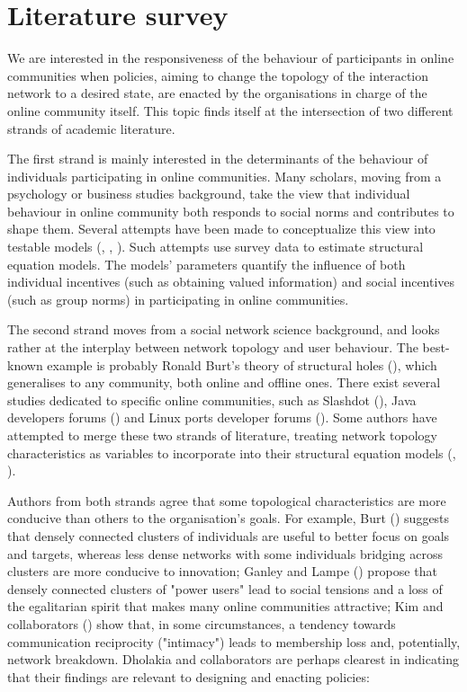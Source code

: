 \section{Literature survey}

We are interested in the responsiveness of the behaviour of participants in online communities when policies, aiming to change the topology of the interaction network to a desired state, are enacted by the organisations in charge of the online community itself. This topic finds itself at the intersection of two different strands of academic literature.

The first strand is mainly interested in the determinants of the behaviour of individuals participating in online communities. Many scholars, moving from a psychology or business studies background, take the view that individual behaviour in online community both responds to social norms and contributes to shape them. Several attempts have been made to conceptualize this view into testable models (\cite{armstrong2000online}, \cite{dholakia2004social}, \cite{zhou2011social}). Such attempts use survey data to estimate structural equation models. The models' parameters quantify the influence of both individual incentives (such as obtaining valued information) and social incentives (such as group norms) in participating in online communities. 

The second strand moves from a social network science background, and looks rather at the interplay between network topology and user behaviour. The best-known example is probably Ronald Burt's theory of structural holes (\cite{burt2005brokerage}), which generalises to any community, both online and offline ones. There exist several studies dedicated to specific online communities, such as Slashdot (\cite{toral2009empirical}), Java developers forums (\cite{zhang2007expertise}) and Linux ports developer forums (\cite{ganley2009ties}). Some authors have attempted to merge these two strands of literature, treating network topology characteristics as variables to incorporate into their structural equation models (\cite{toral2009empirical}, \cite{ganley2009ties}).

Authors from both strands agree that some topological characteristics are more conducive than others to the organisation's goals. For example, Burt (\cite{burt2005brokerage}) suggests that densely connected clusters of individuals are useful to better focus on goals and targets, whereas less dense networks with some individuals bridging across clusters are more conducive to innovation; Ganley and Lampe (\cite{ganley2009ties}) propose that densely connected clusters of "power users" lead to social tensions and a loss of the egalitarian spirit that makes many online communities attractive; Kim and collaborators (\cite{kim2015group}) show that, in some circumstances, a tendency towards communication reciprocity ("intimacy") leads to membership loss and, potentially, network breakdown. Dholakia and collaborators are perhaps clearest in indicating that their findings are relevant to designing and enacting policies:

